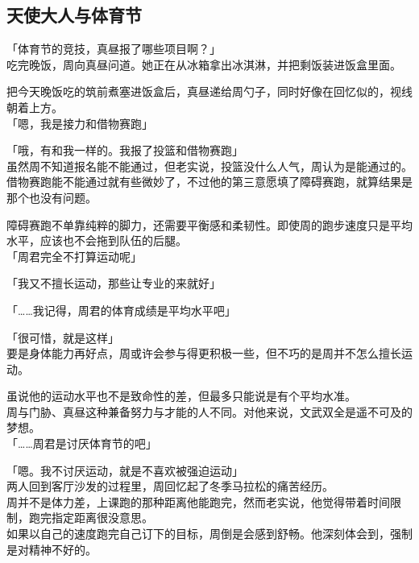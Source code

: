 \subsection{天使大人与体育节}

「体育节的竞技，真昼报了哪些项目啊？」\\

吃完晚饭，周向真昼问道。她正在从冰箱拿出冰淇淋，并把剩饭装进饭盒里面。

把今天晚饭吃的筑前煮塞进饭盒后，真昼递给周勺子，同时好像在回忆似的，视线朝着上方。\\

「嗯，我是接力和借物赛跑」

「哦，有和我一样的。我报了投篮和借物赛跑」\\

虽然周不知道报名能不能通过，但老实说，投篮没什么人气，周认为是能通过的。\\

借物赛跑能不能通过就有些微妙了，不过他的第三意愿填了障碍赛跑，就算结果是那个也没有问题。

障碍赛跑不单靠纯粹的脚力，还需要平衡感和柔韧性。即使周的跑步速度只是平均水平，应该也不会拖到队伍的后腿。\\

「周君完全不打算运动呢」

「我又不擅长运动，那些让专业的来就好」

「……我记得，周君的体育成绩是平均水平吧」

「很可惜，就是这样」\\

要是身体能力再好点，周或许会参与得更积极一些，但不巧的是周并不怎么擅长运动。

虽说他的运动水平也不是致命性的差，但最多只能说是有个平均水准。\\

周与门胁、真昼这种兼备努力与才能的人不同。对他来说，文武双全是遥不可及的梦想。\\

「……周君是讨厌体育节的吧」

「嗯。我不讨厌运动，就是不喜欢被强迫运动」\\

两人回到客厅沙发的过程里，周回忆起了冬季马拉松的痛苦经历。\\

周并不是体力差，上课跑的那种距离他能跑完，然而老实说，他觉得带着时间限制，跑完指定距离很没意思。\\

如果以自己的速度跑完自己订下的目标，周倒是会感到舒畅。他深刻体会到，强制是对精神不好的。\\

